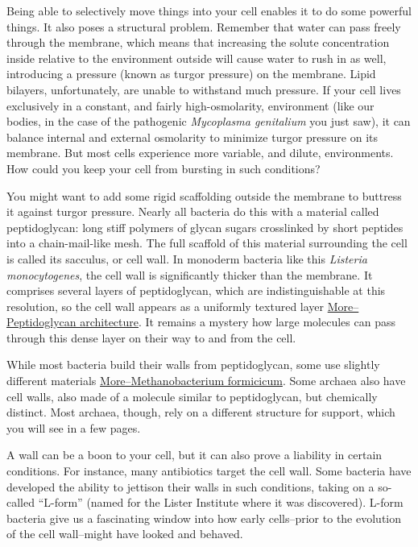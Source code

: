 \documentclass[]{tufte-book}
\begin{document}
Being able to selectively move things into your cell enables it to do
some powerful things. It also poses a structural problem. Remember that
water can pass freely through the membrane, which means that increasing
the solute concentration inside relative to the environment outside will
cause water to rush in as well, introducing a pressure (known as turgor
pressure) on the membrane. Lipid bilayers, unfortunately, are unable to
withstand much pressure. If your cell lives exclusively in a constant,
and fairly high-osmolarity, environment (like our bodies, in the case of
the pathogenic \emph{Mycoplasma genitalium} you just saw), it can
balance internal and external osmolarity to minimize turgor pressure on
its membrane. But most cells experience more variable, and dilute,
environments. How could you keep your cell from bursting in such
conditions?

You might want to add some rigid scaffolding outside the membrane to
buttress it against turgor pressure. Nearly all bacteria do this with a
material called peptidoglycan: long stiff polymers of glycan sugars
crosslinked by short peptides into a chain-mail-like mesh. The full
scaffold of this material surrounding the cell is called its sacculus,
or cell wall. In monoderm bacteria like this \emph{Listeria
monocytogenes}, the cell wall is significantly thicker than the
membrane. It comprises several layers of peptidoglycan, which are
indistinguishable at this resolution, so the cell wall appears as a
uniformly textured layer
\protect\hyperlink{morepeptidoglycan-architecture}{More--Peptidoglycan
architecture}. It remains a mystery how large molecules can pass through
this dense layer on their way to and from the cell.

While most bacteria build their walls from peptidoglycan, some use
slightly different materials
\protect\hyperlink{moremethanobacterium-formicicum}{More--Methanobacterium
formicicum}. Some archaea also have cell walls, also made of a molecule
similar to peptidoglycan, but chemically distinct. Most archaea, though,
rely on a different structure for support, which you will see in a few
pages.

A wall can be a boon to your cell, but it can also prove a liability in
certain conditions. For instance, many antibiotics target the cell wall.
Some bacteria have developed the ability to jettison their walls in such
conditions, taking on a so-called ``L-form'' (named for the Lister
Institute where it was discovered). L-form bacteria give us a
fascinating window into how early cells--prior to the evolution of the
cell wall--might have looked and behaved.
\end{document}
